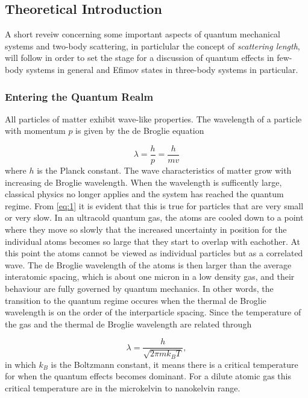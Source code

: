 \documentclass{article}
\numberwithin{equation}{section}
\numberwithin{figure}{section}
\begin{document}
\subsection{Theoretical Introduction}
A short reveiw concerning some important aspects of quantum mechanical systems and two-body scattering, in particlular the concept of \emph{scattering length}, will follow in order to set the stage for a discussion of quantum effects in few-body systems in general and Efimov states in three-body systems in particular. 

\subsubsection{Entering the Quantum Realm}
All particles of matter exhibit wave-like properties. The wavelength of a particle with momentum $p$ is given by the de Broglie equation

\begin{equation} \label{eq:1}
\lambda = \frac{h}{p} = \frac{h}{mv}
\end{equation}
where $h$ is the Planck constant. The wave characteristics of matter grow with increasing de Broglie wavelength. When the wavelength is sufficently large, classical physics no longer applies and the system has reached the quantum regime. From \ref{eq:1} it is evident that this is true for particles that are very small or very slow. In an ultracold quantum gas, the atoms are cooled down to a point where they move so slowly that the increased uncertainty in position for the individual atoms becomes so large that they start to overlap with eachother. At this point the atoms cannot be viewed as individual particles but as a correlated wave. The de Broglie wavelength of the atoms is then larger than the average interatomic spacing, which is about one micron in a low density gas, and their behaviour are fully governed by quantum mechanics. In other words, the transition to the quantum regime occures when the thermal de Broglie wavelength is on the order of the interparticle spacing. Since the temperature of the gas and the thermal de Broglie wavelength are related through

\begin{equation}
\lambda = \frac{h}{\sqrt{2\pi m k_B T}},
\end{equation}
in which $k_B$ is the Boltzmann constant, it means there is a critical temperature for when the quantum effects becomes dominant. For a dilute atomic gas this critical temperature are in the microkelvin to nanokelvin range.
 
\end{document}
